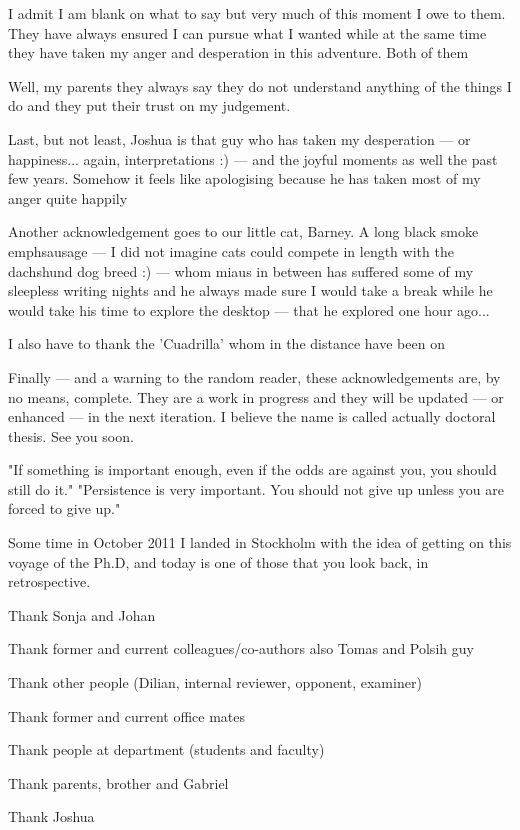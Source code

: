 I admit I am blank on what to say but very much of this 
moment I owe to them. They have always ensured I can pursue what I wanted while 
at the same time they have taken my anger and desperation in this adventure. Both 
of them 

Well, my parents they always say they do not understand 
anything of the things I do and they put their trust on my judgement. 

Last, but not least, Joshua is that guy who has taken my desperation --- or happiness... 
again, interpretations :) --- and the joyful moments as well the past few years. 
Somehow it feels like apologising because he has taken most of my anger quite happily 

Another acknowledgement goes to our little cat, Barney. A long black smoke emph{sausage} --- 
I did not imagine cats could compete in length with the dachshund dog breed :) --- 
whom miaus in between has suffered some of my sleepless writing nights and he always 
made sure I would take a break while he would take his time to explore the desktop --- 
that he explored one hour ago...

I also have to thank the 'Cuadrilla' whom in the distance have been on

Finally --- and a warning to the random reader, these acknowledgements are, by no 
means, complete. They are a work in progress and they will be updated --- or enhanced ---
in the next iteration. I believe the name is called actually doctoral thesis. See 
you soon.

"If something is important enough, even if the odds are against you, you should still do it."
"Persistence is very important. You should not give up unless you are forced to give up."

Some time in October 2011 I landed in Stockholm with the idea of getting on this 
voyage of the Ph.D, and today is one of those that you look back, in retrospective.

Thank Sonja and Johan

Thank former and current colleagues/co-authors also Tomas and Polsih guy

Thank other people (Dilian, internal reviewer, opponent, examiner)

Thank former and current office mates

Thank people at department (students and faculty)

Thank parents, brother and Gabriel

Thank Joshua

